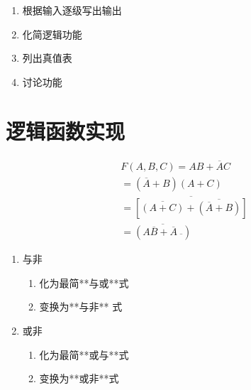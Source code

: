 \begin{enumerate}
\begin{enumerate}
\end{enumerate}

\newpage

\begin{enumerate}

    \item 根据输入逐级写出输出
    \item 化简逻辑功能
    \item 列出真值表
    \item 讨论功能

\end{enumerate}

\section{逻辑函数实现}

\begin{equation}
    \begin{aligned}
        F(A,B,C)=AB+\overline{A}C                                             \\
        =(\overline{A}+B)(A+C)                                                \\
        =\overline{\left[\overline{(A+C)}+\overline{(\overline{A}+B)}\right]} \\
        =\overline{(A\overline{B}+\overline{A}~\overline{})}
    \end{aligned}
\end{equation}

\newpage

\begin{enumerate}

    \item 与非

          \begin{enumerate}

              \item 化为最简**与或**式
              \item 变换为**与非** 式

          \end{enumerate}

    \item 或非

          \begin{enumerate}

              \item 化为最简**或与**式
              \item 变换为**或非**式


\end{enumerate}
\end{enumerate}
\end{enumerate}
